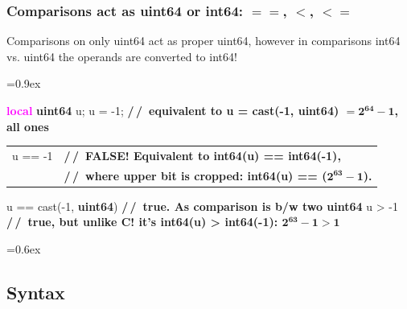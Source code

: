 \documentclass[8pt]{extarticle}
\newenvironment{code}[1][]{%
\begin{prebox}[#1]\obeylines%
\fontdimen2\font=0.9ex%
}{%
\end{prebox}%
\fontdimen2\font=0.6ex%
}
\newcommand{\ind}{\hphantom{~~~}}
\newcommand{\kw}[1]{\textcolor{magenta}{\textbf{#1}}}
\newcommand{\ty}[1]{\textcolor{myOrange}{\textbf{#1}}}
\newcommand{\cmtcommon}[1]{\textcolor{Sepia}{\textbf{#1}}}
\newcommand{\cmtd}[1]{\cmtcommon{/\,/\ #1}}
\newcommand{\local}{\kw{local} }
\begin{document}
\begin{multicols*}{3}
\subsubsection{Comparisons act as uint64 or int64: $==$, $<$, $<=$}
Comparisons on only uint64 act as proper uint64, however
in comparisons int64 vs. uint64 the operands are converted to int64!

        \begin{code}
            \local \ty{uint64} u;
            u = -1; \ind \cmtd{equivalent to u = cast(-1, uint64) $\mathbf{= 2^{64}-1}$, all ones}
            \noindent\begin{tabular}{@{}ll}
                u == -1 & \cmtd{FALSE! Equivalent to int64(u) == int64(-1),} \\
                        & \cmtd{where upper bit is cropped: int64(u) == ($\mathbf{2^{63}-1}$).}
            \end{tabular}
            u == cast(-1, \ty{uint64}) \cmtd{true. As comparison is b/w two uint64}
            u > -1 \ind \cmtd{true, but unlike C! it's int64(u) > int64(-1): $\mathbf{2^{63}-1>1}$}
        \end{code}

\subsection{Syntax}


\end{multicols*}
\end{document}
